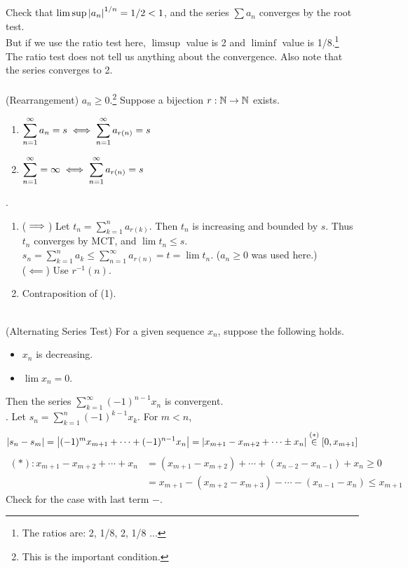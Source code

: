 Check that $\limsup \left|a_n\right|^{1/n} = 1/2 < 1$, and the series $ \sum a_n $ converges by the root test.\\
But if we use the ratio test here, $\limsup$ value is 2 and $\liminf$ value is 1/8.\footnote{The ratios are: 2, 1/8, 2, 1/8 ...} The ratio test does not tell us anything about the convergence. Also note that the series converges to 2.\\
\\
 (Rearrangement) $a_n\geq 0$.\footnote{This is the important condition.} Suppose a bijection $r: \mathbb{N} \rightarrow \mathbb{N}$ exists.
\begin{enumerate}
	\item $\displaystyle \sum_{n=1}^\infty a_n = s \iff \sum_{n=1}^\infty a_{r(n)} = s$
	\item $\displaystyle \sum_{n=1}^\infty = \infty \iff \sum_{n=1}^\infty a_{r(n)} = s$
\end{enumerate}
\pf.
\begin{enumerate}
	\item ($\implies$) Let $t_n=\sum_{k=1}^n a_{r(k)}$. Then $t_n$ is increasing and bounded by $s$. Thus $t_n$ converges by MCT, and $\lim t_n \leq s$.\\
	$s_n = \sum_{k=1}^n a_k \leq \sum_{n=1}^\infty a_{r(n)} = t = \lim t_n$. ($a_n\geq 0$ was used here.)\\
	($\impliedby$) Use $r^{-1}(n)$.
	\item Contraposition of (1).
\end{enumerate}~\\
 (Alternating Series Test) For a given sequence $x_n$, suppose the following holds.
\begin{itemize}
	\item $x_n$ is decreasing.
	\item $\lim x_n = 0$.
\end{itemize}
Then the series $\sum_{k=1}^\infty (-1)^{n-1}x_n$ is convergent.\\
\pf. Let $s_n = \sum_{k=1}^n (-1)^{k-1}x_k$. For $m<n$, $$\left|s_n-s_m\right| = \left|(-1)^m x_{m+1} +\cdots + (-1)^{n-1} x_n\right| = \left|x_{m+1} - x_{m+2}+\cdots \pm x_n\right| \overset{(*)}{\in} [0, x_{m+1}]$$
$\begin{aligned}
	(*): x_{m+1} - x_{m+2} + \cdots + x_n &= (x_{m+1} - x_{m+2}) + \cdots + (x_{n-2} - x_{n-1}) + x_n \geq 0\\
	&=x_{m+1} - (x_{m+2} - x_{m+3}) - \cdots -(x_{n-1}-x_n) \leq x_{m+1}
\end{aligned}$ \\
Check for the case with last term $-$.\\
